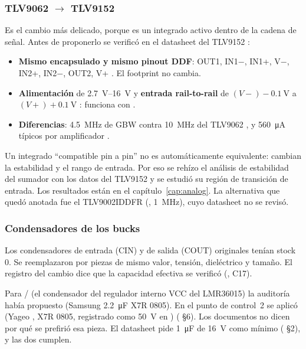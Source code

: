 \subsubsection{TLV9062 $\to$ TLV9152}

Es el cambio más delicado, porque es un integrado activo dentro de la cadena de señal. Antes de proponerlo se verificó en el datasheet del TLV9152 :
\begin{itemize}
  \item \textbf{Mismo encapsulado y mismo pinout DDF}: OUT1, IN1$-$, IN1+, V$-$, IN2+, IN2$-$, OUT2, V+ . El footprint no cambia.
  \item \textbf{Alimentación} de \SIrange{2.7}{16}{\volt} y \textbf{entrada rail-to-rail} de $(V-)-\SI{0.1}{\volt}$ a $(V+)+\SI{0.1}{\volt}$ : funciona con .
  \item \textbf{Diferencias}: \SI{4.5}{\mega\hertz} de GBW contra \SI{10}{\mega\hertz} del TLV9062 , y \SI{560}{\micro\ampere} típicos por amplificador .
\end{itemize}

Un integrado ``compatible pin a pin'' no es automáticamente equivalente: cambian la estabilidad y el rango de entrada. Por eso se rehízo el análisis de estabilidad del sumador con los datos del TLV9152 y se estudió su región de transición de entrada. Los resultados están en el capítulo~\ref{cap:analog}. La alternativa que quedó anotada fue el TLV9002IDDFR (, \SI{1}{\mega\hertz}), cuyo datasheet no se revisó.

\subsubsection{Condensadores de los bucks}

Los condensadores de entrada (CIN) y de salida (COUT) originales tenían stock 0. Se reemplazaron por piezas de mismo valor, tensión, dieléctrico y tamaño. El registro del cambio dice que la capacidad efectiva se verificó (, C17).

Para / (el condensador del regulador interno VCC del LMR36015) la auditoría había propuesto  (Samsung \SI{2.2}{\micro\farad} X7R 0805). En el punto de control~2 se aplicó  (Yageo , X7R 0805, registrado como \SI{50}{\volt} en ) ( §6). Los documentos no dicen por qué se prefirió esa pieza. El datasheet pide \SI{1}{\micro\farad} de \SI{16}{\volt} como mínimo ( §2), y las dos cumplen.

